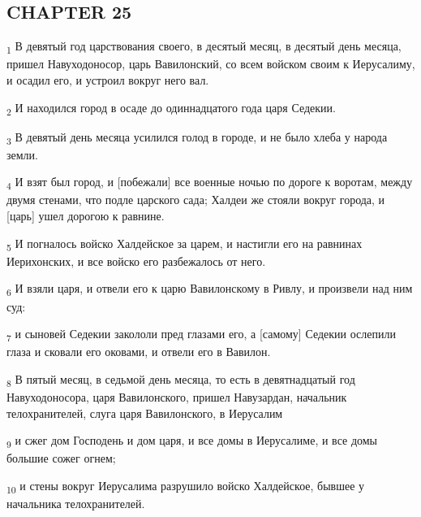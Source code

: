 \subsection{CHAPTER 25}
\begin{tcolorbox}
\textsubscript{1} В девятый год царствования своего, в десятый месяц, в десятый день месяца, пришел Навуходоносор, царь Вавилонский, со всем войском своим к Иерусалиму, и осадил его, и устроил вокруг него вал.
\end{tcolorbox}
\begin{tcolorbox}
\textsubscript{2} И находился город в осаде до одиннадцатого года царя Седекии.
\end{tcolorbox}
\begin{tcolorbox}
\textsubscript{3} В девятый день месяца усилился голод в городе, и не было хлеба у народа земли.
\end{tcolorbox}
\begin{tcolorbox}
\textsubscript{4} И взят был город, и [побежали] все военные ночью по дороге к воротам, между двумя стенами, что подле царского сада; Халдеи же стояли вокруг города, и [царь] ушел дорогою к равнине.
\end{tcolorbox}
\begin{tcolorbox}
\textsubscript{5} И погналось войско Халдейское за царем, и настигли его на равнинах Иерихонских, и все войско его разбежалось от него.
\end{tcolorbox}
\begin{tcolorbox}
\textsubscript{6} И взяли царя, и отвели его к царю Вавилонскому в Ривлу, и произвели над ним суд:
\end{tcolorbox}
\begin{tcolorbox}
\textsubscript{7} и сыновей Седекии закололи пред глазами его, а [самому] Седекии ослепили глаза и сковали его оковами, и отвели его в Вавилон.
\end{tcolorbox}
\begin{tcolorbox}
\textsubscript{8} В пятый месяц, в седьмой день месяца, то есть в девятнадцатый год Навуходоносора, царя Вавилонского, пришел Навузардан, начальник телохранителей, слуга царя Вавилонского, в Иерусалим
\end{tcolorbox}
\begin{tcolorbox}
\textsubscript{9} и сжег дом Господень и дом царя, и все домы в Иерусалиме, и все домы большие сожег огнем;
\end{tcolorbox}
\begin{tcolorbox}
\textsubscript{10} и стены вокруг Иерусалима разрушило войско Халдейское, бывшее у начальника телохранителей.
\end{tcolorbox}
